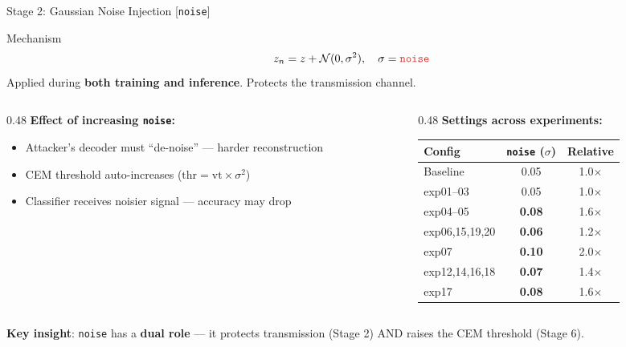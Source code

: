 \documentclass[aspectratio=169, 10pt]{beamer}
\newcommand{\param}[1]{\textcolor{paramred}{\texttt{#1}}}
\newcommand{\good}[1]{\textcolor{goodgreen}{#1}}
\newcommand{\warn}[1]{\textcolor{warnorg}{#1}}
\begin{document}
\begin{frame}{Stage 2: Gaussian Noise Injection \quad\small[\param{noise}]}

\begin{block}{Mechanism}
\vspace{-0.2cm}
$$z_n = z + \mathcal{N}(0, \sigma^2), \quad \sigma = \param{noise}$$
Applied during \textbf{both training and inference}. Protects the transmission channel.
\end{block}

\vspace{0.2cm}

\begin{columns}[T]
\begin{column}{0.48\textwidth}
\textbf{Effect of increasing \param{noise}:}
\begin{itemize}
    \item[\good{$\uparrow$}] Attacker's decoder must ``de-noise'' --- harder reconstruction
    \item[\good{$\uparrow$}] CEM threshold auto-increases ($\text{thr} = \text{vt} \times \sigma^2$)
    \item[\warn{$\downarrow$}] Classifier receives noisier signal --- accuracy may drop
\end{itemize}
\end{column}
\begin{column}{0.48\textwidth}
\textbf{Settings across experiments:}
\begin{center}
\small
\begin{tabular}{lcc}
\toprule
\textbf{Config} & \param{noise} ($\sigma$) & \textbf{Relative} \\
\midrule
Baseline & 0.05 & 1.0$\times$ \\
exp01--03 & 0.05 & 1.0$\times$ \\
exp04--05 & \textbf{0.08} & 1.6$\times$ \\
exp06,15,19,20 & \textbf{0.06} & 1.2$\times$ \\
exp07 & \textbf{0.10} & 2.0$\times$ \\
exp12,14,16,18 & \textbf{0.07} & 1.4$\times$ \\
exp17 & \textbf{0.08} & 1.6$\times$ \\
\bottomrule
\end{tabular}
\end{center}
\end{column}
\end{columns}

\vspace{0.2cm}
\small
\textbf{Key insight}: \param{noise} has a \textbf{dual role} --- it protects transmission (Stage 2) AND raises the CEM threshold (Stage 6).

\end{frame}
\end{document}
